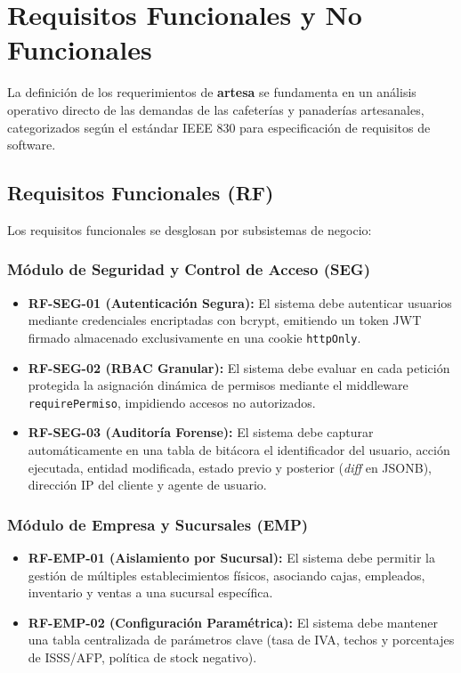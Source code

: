 \section{Requisitos Funcionales y No Funcionales}
\label{sec:requisitos}

La definición de los requerimientos de \textbf{artesa} se fundamenta en un análisis operativo directo de las demandas de las cafeterías y panaderías artesanales, categorizados según el estándar IEEE 830 para especificación de requisitos de software.

\subsection{Requisitos Funcionales (RF)}

Los requisitos funcionales se desglosan por subsistemas de negocio:

\subsubsection{Módulo de Seguridad y Control de Acceso (SEG)}
\begin{itemize}
    \item \textbf{RF-SEG-01 (Autenticación Segura):} El sistema debe autenticar usuarios mediante credenciales encriptadas con bcrypt, emitiendo un token JWT firmado almacenado exclusivamente en una cookie \texttt{httpOnly}.
    \item \textbf{RF-SEG-02 (RBAC Granular):} El sistema debe evaluar en cada petición protegida la asignación dinámica de permisos mediante el middleware \texttt{requirePermiso}, impidiendo accesos no autorizados.
    \item \textbf{RF-SEG-03 (Auditoría Forense):} El sistema debe capturar automáticamente en una tabla de bitácora el identificador del usuario, acción ejecutada, entidad modificada, estado previo y posterior (\textit{diff} en JSONB), dirección IP del cliente y agente de usuario.
\end{itemize}

\subsubsection{Módulo de Empresa y Sucursales (EMP)}
\begin{itemize}
    \item \textbf{RF-EMP-01 (Aislamiento por Sucursal):} El sistema debe permitir la gestión de múltiples establecimientos físicos, asociando cajas, empleados, inventario y ventas a una sucursal específica.
    \item \textbf{RF-EMP-02 (Configuración Paramétrica):} El sistema debe mantener una tabla centralizada de parámetros clave (tasa de IVA, techos y porcentajes de ISSS/AFP, política de stock negativo).
\end{itemize}

